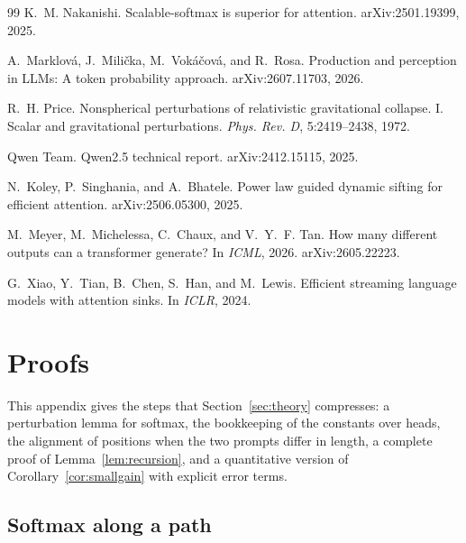 \documentclass[11pt]{article}
\theoremstyle{definition}
\theoremstyle{remark}
\begin{document}
\begin{thebibliography}{99}
K.~M. Nakanishi.
\newblock Scalable-softmax is superior for attention.
\newblock arXiv:2501.19399, 2025.

A.~Marklov{\'a}, J.~Mili{\v{c}}ka, M.~Vok{\'a}{\v{c}}ov{\'a}, and R.~Rosa.
\newblock Production and perception in {LLMs}: A token probability approach.
\newblock arXiv:2607.11703, 2026.

R.~H. Price.
\newblock Nonspherical perturbations of relativistic gravitational collapse. {I}. {S}calar and gravitational perturbations.
\newblock \emph{Phys. Rev. D}, 5:2419--2438, 1972.

Qwen Team.
\newblock Qwen2.5 technical report.
\newblock arXiv:2412.15115, 2025.

N.~Koley, P.~Singhania, and A.~Bhatele.
\newblock Power law guided dynamic sifting for efficient attention.
\newblock arXiv:2506.05300, 2025.

M.~Meyer, M.~Michelessa, C.~Chaux, and V.~Y.~F. Tan.
\newblock How many different outputs can a transformer generate?
\newblock In \emph{ICML}, 2026. arXiv:2605.22223.

G.~Xiao, Y.~Tian, B.~Chen, S.~Han, and M.~Lewis.
\newblock Efficient streaming language models with attention sinks.
\newblock In \emph{ICLR}, 2024.

\end{thebibliography}

\appendix
\section{Proofs}
\label{app:proofs}

This appendix gives the steps that Section~\ref{sec:theory} compresses: a perturbation lemma for softmax, the bookkeeping of the constants over heads, the alignment of positions when the two prompts differ in length, a complete proof of Lemma~\ref{lem:recursion}, and a quantitative version of Corollary~\ref{cor:smallgain} with explicit error terms.

\subsection{Softmax along a path}
\end{document}

